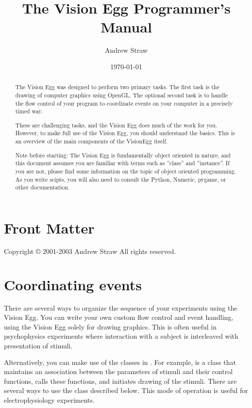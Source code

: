 \documentclass{manual}
\title{The Vision Egg Programmer's Manual}
\author{Andrew Straw}
\date{\today}			%
\begin{document}
\maketitle

\ifhtml
\chapter*{Front Matter\label{front}}
\fi

Copyright \copyright{} 2001-2003 Andrew Straw
All rights reserved.

\begin{abstract}

\noindent
The Vision Egg was designed to perform two primary tasks.  The first
task is the drawing of computer graphics using OpenGL.  The optional
second task is to handle the flow control of your program to
coordinate events on your computer in a precisely timed way.

These are challenging tasks, and the Vision Egg does much of the work
for you. However, to make full use of the Vision Egg, you should
understand the basics.  This is an overview of the main components of
the VisionEgg itself.

Note before starting: The Vision Egg is fundamentally object oriented
in nature, and this document assumes you are familiar with terms such
as ''class'' and ''instance''.  If you are not, please find some
information on the topic of object oriented programming.  As you write
scipts, you will also need to consult the Python, Numeric, pygame, or
other documentation.
\end{abstract}

\tableofcontents

\chapter{Coordinating events \label{coordinating events}}

There are several ways to organize the sequence of your experiments
using the Vision Egg.  You can write your own custom flow control and
event handling, using the Vision Egg solely for drawing graphics.
This is often useful in psychophysics experiments where interaction
with a subject is interleaved with presentation of stimuli.

Alternatively, you can make use of the classes in
.  For example,  is a class
that maintains an association between the parameters of stimuli and
their control functions, calls these functions, and initiates drawing
of the stimuli.  There are several ways to use the
 class described below.  This mode of operation is
useful for electrophysiology experiments.
\end{document}
